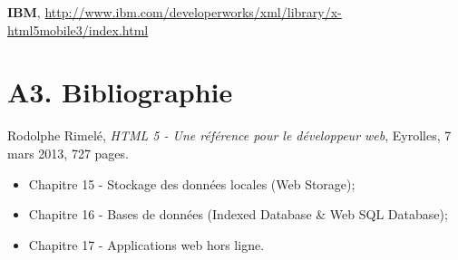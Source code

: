 	\textbf{IBM}, \url{http://www.ibm.com/developerworks/xml/library/x-html5mobile3/index.html}

\section{A3. Bibliographie}

	Rodolphe Rimelé, \textit{HTML 5 - Une référence pour le développeur web}, Eyrolles, 7 mars 2013, 727 pages.
	\begin{itemize}
		\item Chapitre 15 - Stockage des données locales (Web Storage);
		\item Chapitre 16 - Bases de données (Indexed Database \& Web SQL Database);
		\item Chapitre 17 - Applications web hors ligne.
	\end{itemize}


